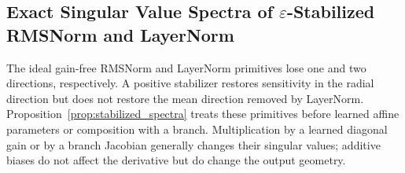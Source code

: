 \documentclass[10pt]{article}
\theoremstyle{definition}
\theoremstyle{remark}
\begin{document}
\subsection{Exact Singular Value Spectra of $\varepsilon$-Stabilized RMSNorm and LayerNorm}

The ideal gain-free RMSNorm and LayerNorm primitives lose one and two directions, respectively. A positive stabilizer restores sensitivity in the radial direction but does not restore the mean direction removed by LayerNorm. Proposition~\ref{prop:stabilized_spectra} treats these primitives before learned affine parameters or composition with a branch. Multiplication by a learned diagonal gain or by a branch Jacobian generally changes their singular values; additive biases do not affect the derivative but do change the output geometry.
\end{document}
